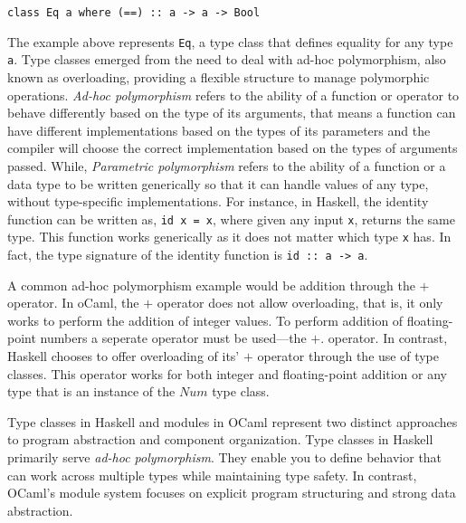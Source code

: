 \lstinline{class Eq a where (==) :: a -> a -> Bool}

The example above represents \lstinline{Eq}, a type class that defines equality for any type \lstinline{a}. Type classes emerged from the need to deal with ad-hoc polymorphism, also known as overloading, providing a flexible structure to manage polymorphic operations. 
\textit{Ad-hoc polymorphism} refers to the ability of a function or operator to behave differently based on the type of its arguments, that means a function can have different implementations based on the types of its parameters and the compiler will choose the correct implementation based on the types of arguments passed.
While, \textit{Parametric polymorphism} refers to the ability of a function or a data type to be written generically so that it can handle values of any type, without type-specific implementations. For instance, in Haskell, the identity function can be written as, \lstinline{id x = x}, where given any input \lstinline{x}, returns the same type. This function works generically as it does not matter which type \lstinline{x} has. In fact, the type signature of the identity function is \lstinline|id :: a -> a|.


A common ad-hoc polymorphism example would be addition through the $+$ operator. In oCaml, the $+$ operator does not allow overloading, that is, it only works to perform the addition of integer values. To perform addition of floating-point numbers a seperate operator must be used---the $+.$ operator. In contrast, Haskell chooses to offer overloading of its' $+$ operator through the use of type classes. This operator works for both integer and floating-point addition or any type that is an instance of the $Num$ type class.



Type classes in Haskell and modules in OCaml represent two distinct approaches to program abstraction and component organization. Type classes in Haskell primarily serve \textit{ad-hoc polymorphism}. They enable you to define behavior that can work across multiple types while maintaining type safety. 
In contrast, OCaml's module system focuses on explicit program structuring and strong data abstraction. 

